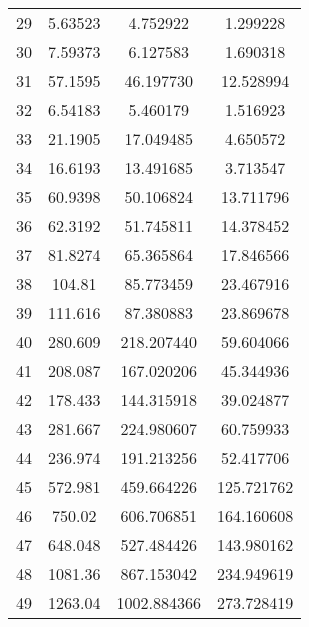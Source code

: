 \documentclass[a4paper,11pt,oneside,openany]{jsbook}
\begin{document}
\begin{table}[]
{\begin{tabular}{|c|c|c|c|}
29 & 5.63523 & 4.752922 & 1.299228 \\
30 & 7.59373 & 6.127583 & 1.690318 \\
31 & 57.1595 & 46.197730 & 12.528994 \\
32 & 6.54183 & 5.460179 & 1.516923 \\
33 & 21.1905 & 17.049485 & 4.650572 \\
34 & 16.6193 & 13.491685 & 3.713547 \\
35 & 60.9398 & 50.106824 & 13.711796 \\
36 & 62.3192 & 51.745811 & 14.378452 \\
37 & 81.8274 & 65.365864 & 17.846566 \\
38 & 104.81 & 85.773459 & 23.467916 \\
39 & 111.616 & 87.380883 & 23.869678 \\
40 & 280.609 & 218.207440 & 59.604066 \\
41 & 208.087 & 167.020206 & 45.344936 \\
42 & 178.433 & 144.315918 & 39.024877 \\
43 & 281.667 & 224.980607 & 60.759933 \\
44 & 236.974 & 191.213256 & 52.417706 \\
45 & 572.981 & 459.664226 & 125.721762 \\
46 & 750.02 & 606.706851 & 164.160608 \\
47 & 648.048 & 527.484426 & 143.980162 \\
48 & 1081.36 & 867.153042 & 234.949619 \\
49 & 1263.04 & 1002.884366 & 273.728419 \\ \hline
\end{tabular}
}
\end{table}
\end{document}
